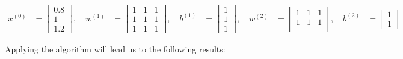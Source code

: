 \documentclass[12pt]{article}
\begin{document}
\begin{enumerate}[leftmargin=\labelsep]
        \begin{equation*}
          \begin{aligned}
            x^{(0)} & = \begin{bmatrix}
                          0.8 \\
                          1   \\
                          1.2
                        \end{bmatrix}, \quad
            w^{(1)} & = \begin{bmatrix}
                          1 & 1 & 1 \\
                          1 & 1 & 1 \\
                          1 & 1 & 1
                        \end{bmatrix}, \quad
            b^{(1)} & = \begin{bmatrix}
                          1 \\
                          1 \\
                          1
                        \end{bmatrix}, \quad
            w^{(2)} & = \begin{bmatrix}
                          1 & 1 & 1 \\
                          1 & 1 & 1 \\
                        \end{bmatrix}, \quad
            b^{(2)} & = \begin{bmatrix}
                          1 \\
                          1
                        \end{bmatrix}
          \end{aligned}
        \end{equation*}

        Applying the algorithm will lead us to the following results:


\end{enumerate}
\end{document}
